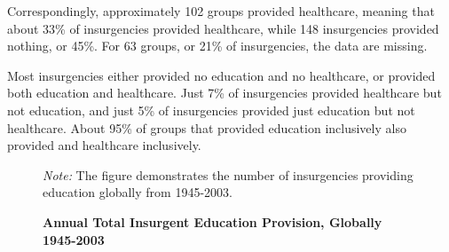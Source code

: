 \documentclass[12pt, letterpaper]{article}
\begin{document}
Correspondingly, approximately 102 groups provided healthcare, meaning that about 33\% of insurgencies provided healthcare, while 148 insurgencies provided nothing, or 45\%. For 63 groups, or  21\% of insurgencies, the data are missing. %

Most insurgencies either provided no education and no healthcare, or provided both education and healthcare. Just 7\% of insurgencies provided healthcare but not education, and just 5\% of insurgencies provided just education but not healthcare. About 95\% of groups that provided education inclusively also provided and healthcare inclusively. 

\newpage
\begin{center}
\begin{figure}[h!]
\renewcommand\thefigure{A.\arabic{figure}}
\begin{center}
\caption{\textbf{Annual Total Insurgent Education Provision, Globally 1945-2003}}
\label{figure:insurgenteduany}
\end{center}
\begin{tablenotes}
\raggedright \footnotesize{\textit{Note:} The figure demonstrates the number of insurgencies providing education globally from 1945-2003.} 
\end{tablenotes}
\end{figure}
\end{center}
\end{document}
